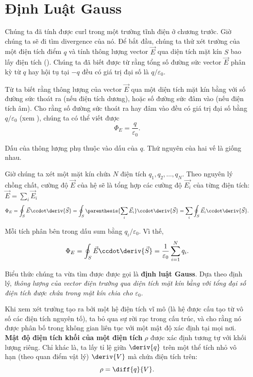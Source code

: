 \section{Định Luật Gauss}\label{sec:1_13}

Chúng ta đã tính được curl trong một trường tĩnh điện ở chương trước. Giờ chúng ta sẽ đi tìm divergence của nó. Để bắt đầu, chúng ta thử xét trường của một điện tích điểm $q$ và tính thông lượng vector $\vec{E}$ qua diện tích mặt kín $S$ bao lấy điện tích (). Chúng ta đã biết được từ  rằng tổng số đường sức vector $\vec{E}$ phân kỳ từ $q$ hay hội tụ tại $-q$ đều có giá trị đại số là $q/\varepsilon_0$.

Từ  ta biết rằng thông lượng của vector $\vec{E}$ qua một diện tích mặt kín bằng với số đường sức thoát ra (nếu điện tích dương), hoặc số đường sức đâm vào (nếu điện tích âm). Cho rằng số đường sức thoát ra hay đâm vào đều có giá trị đại số bằng $q/\varepsilon_0$ (xem ), chúng ta có thể viết được
\begin{equation}\label{eq:1_113}
	\Phi_E = \frac{q}{\varepsilon_0}.
\end{equation}

\noindent
Dấu của thông lượng phụ thuộc vào dấu của $q$. Thứ nguyên của hai vế là giống nhau.

Giờ chúng ta xét một mặt kín chứa $N$ điện tích $q_1, q_2, \ldots, q_N$. Theo nguyên lý chồng chất, cường độ $\vec{E}$ của hệ sẽ là tổng hợp các cường độ $\vec{E_i}$ của từng điện tích: $\vec{E}=\sum_i\vec{E}_i$
\begin{equation*}
	\Phi_E = \oint_S \vec{E}\ccdot\deriv{\vec{S}} = \oint_S \parenthesis{\sum_i\vec{E}_i}\ccdot\deriv{\vec{S}} = \sum_i\oint_S\vec{E}_i\ccdot\deriv{\vec{S}}.
\end{equation*}

\noindent
Mỗi tích phân bên trong dấu sum bằng $q_i/\varepsilon_0$. Vì thế,
\begin{equation}\label{eq:1_114}
	\Phi_E = \oint_S \vec{E}\ccdot\deriv{\vec{S}} = \frac{1}{\varepsilon_0} \sum_{i=1}^N q_i.
\end{equation}

\noindent
Biểu thức chúng ta vừa tìm được được gọi là \textbf{định luật Gauss}. Dựa theo định lý, \textit{thông lượng của vector điện trường qua diện tích mặt kín bằng với tổng đại số điện tích được chứa trong mặt kín chia cho $\varepsilon_0$}.

Khi xem xét trường tạo ra bởi một hệ điện tích vĩ mô (là hệ được cấu tạo từ vô số các điện tích nguyên tố), ta bỏ qua sự rời rạc trong cấu trúc, và cho rằng nó được phân bố trong không gian liên tục với một mật độ xác định tại mọi nơi. \textbf{Mật độ điện tích khối của một điện tích} $\rho$ được xác định tương tự với khối lượng riêng. Chỉ khác là, ta lấy tỉ lệ giữa $\deriv{q}$ trên một thể tích nhỏ vô hạn (theo quan điểm vật lý) $\deriv{V}$ mà chứa điện tích trên:
\begin{equation}\label{eq:1_115}
	\rho = \diff{q}{V}.
\end{equation}

